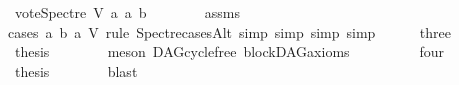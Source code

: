 \begin{isabellebody}
\ {\isachardoublequoteopen}vote{\isacharunderscore}{\kern0pt}Spectre\ V\ a\ a\ b\ {\isasymnoteq}\ {}{\isachardoublequoteclose}\isanewline
\ \ \ \ \isamarkupfalse%
\ assms\isanewline
\ \ \isamarkupfalse%
{\isacharparenleft}{\kern0pt}cases\ a\ b\ a\ V\ rule{\isacharcolon}{\kern0pt}\ Spectre{\isacharunderscore}{\kern0pt}casesAlt{\isacharcomma}{\kern0pt}\ simp{\isacharcomma}{\kern0pt}\ simp{\isacharcomma}{\kern0pt}\ simp{\isacharcomma}{\kern0pt}\ simp{\isacharparenright}{\kern0pt}\isanewline
\ \ \ \ \isamarkupfalse%
\ three\isanewline
\ \ \ \ \isamarkupfalse%
\ \isamarkupfalse%
\ {\isacharquery}{\kern0pt}thesis\isanewline
\ \ \ \ \ \ \isamarkupfalse%
\ {\isacharparenleft}{\kern0pt}meson\ DAG{\isachardot}{\kern0pt}cycle{\isacharunderscore}{\kern0pt}free\ blockDAG{\isachardot}{\kern0pt}axioms{\isacharparenleft}{\kern0pt}{}{\isacharparenright}{\kern0pt}{\isacharparenright}{\kern0pt}\ \isanewline
\ \ \isamarkupfalse%
\isanewline
\ \ \ \ \isamarkupfalse%
\ four\isanewline
\ \ \ \ \isamarkupfalse%
\ \isamarkupfalse%
\ {\isacharquery}{\kern0pt}thesis\isanewline
\ \ \ \ \ \ \isamarkupfalse%
\ blast\ \isanewline
\ \ \isamarkupfalse%
\isanewline
{}\isamarkupfalse%
%
\endisatagproof
{\isafoldproof}%
%
\isadelimproof
\isanewline
%
\endisadelimproof
%
\isadelimtheory
\isanewline
%
\endisadelimtheory
%
\isatagtheory
{}\isamarkupfalse%
%
\endisatagtheory
{\isafoldtheory}%
%
\isadelimtheory
%
\endisadelimtheory
%
\end{isabellebody}%
\endinput
